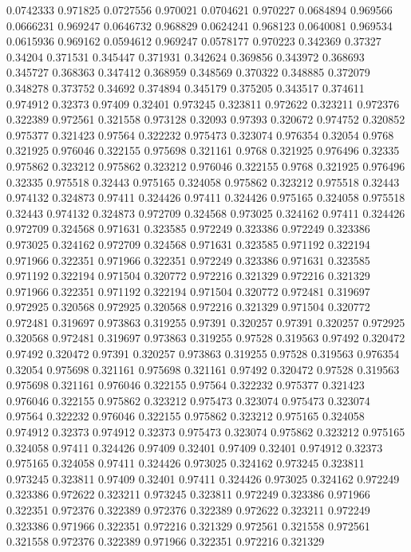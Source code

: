 0.0742333 0.971825
0.0727556 0.970021
0.0704621 0.970227
0.0684894 0.969566
0.0666231 0.969247
0.0646732 0.968829
0.0624241 0.968123
0.0640081 0.969534
0.0615936 0.969162
0.0594612 0.969247
0.0578177 0.970223
0.342369 0.37327
0.34204 0.371531
0.345447 0.371931
0.342624 0.369856
0.343972 0.368693
0.345727 0.368363
0.347412 0.368959
0.348569 0.370322
0.348885 0.372079
0.348278 0.373752
0.34692 0.374894
0.345179 0.375205
0.343517 0.374611
0.974912 0.32373
0.97409 0.32401
0.973245 0.323811
0.972622 0.323211
0.972376 0.322389
0.972561 0.321558
0.973128 0.32093
0.97393 0.320672
0.974752 0.320852
0.975377 0.321423
0.97564 0.322232
0.975473 0.323074
0.976354 0.32054
0.9768 0.321925
0.976046 0.322155
0.975698 0.321161
0.9768 0.321925
0.976496 0.32335
0.975862 0.323212
0.975862 0.323212
0.976046 0.322155
0.9768 0.321925
0.976496 0.32335
0.975518 0.32443
0.975165 0.324058
0.975862 0.323212
0.975518 0.32443
0.974132 0.324873
0.97411 0.324426
0.97411 0.324426
0.975165 0.324058
0.975518 0.32443
0.974132 0.324873
0.972709 0.324568
0.973025 0.324162
0.97411 0.324426
0.972709 0.324568
0.971631 0.323585
0.972249 0.323386
0.972249 0.323386
0.973025 0.324162
0.972709 0.324568
0.971631 0.323585
0.971192 0.322194
0.971966 0.322351
0.971966 0.322351
0.972249 0.323386
0.971631 0.323585
0.971192 0.322194
0.971504 0.320772
0.972216 0.321329
0.972216 0.321329
0.971966 0.322351
0.971192 0.322194
0.971504 0.320772
0.972481 0.319697
0.972925 0.320568
0.972925 0.320568
0.972216 0.321329
0.971504 0.320772
0.972481 0.319697
0.973863 0.319255
0.97391 0.320257
0.97391 0.320257
0.972925 0.320568
0.972481 0.319697
0.973863 0.319255
0.97528 0.319563
0.97492 0.320472
0.97492 0.320472
0.97391 0.320257
0.973863 0.319255
0.97528 0.319563
0.976354 0.32054
0.975698 0.321161
0.975698 0.321161
0.97492 0.320472
0.97528 0.319563
0.975698 0.321161
0.976046 0.322155
0.97564 0.322232
0.975377 0.321423
0.976046 0.322155
0.975862 0.323212
0.975473 0.323074
0.975473 0.323074
0.97564 0.322232
0.976046 0.322155
0.975862 0.323212
0.975165 0.324058
0.974912 0.32373
0.974912 0.32373
0.975473 0.323074
0.975862 0.323212
0.975165 0.324058
0.97411 0.324426
0.97409 0.32401
0.97409 0.32401
0.974912 0.32373
0.975165 0.324058
0.97411 0.324426
0.973025 0.324162
0.973245 0.323811
0.973245 0.323811
0.97409 0.32401
0.97411 0.324426
0.973025 0.324162
0.972249 0.323386
0.972622 0.323211
0.973245 0.323811
0.972249 0.323386
0.971966 0.322351
0.972376 0.322389
0.972376 0.322389
0.972622 0.323211
0.972249 0.323386
0.971966 0.322351
0.972216 0.321329
0.972561 0.321558
0.972561 0.321558
0.972376 0.322389
0.971966 0.322351
0.972216 0.321329
